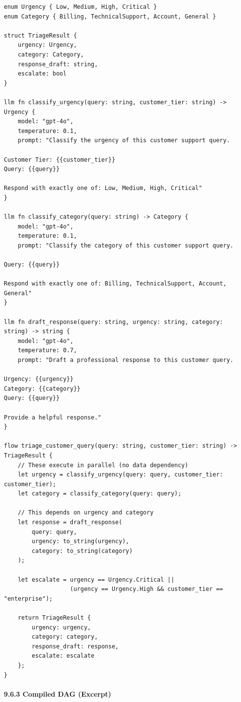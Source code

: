 \documentclass[
]{article}
\begin{document}
\begin{lstlisting}
enum Urgency { Low, Medium, High, Critical }
enum Category { Billing, TechnicalSupport, Account, General }

struct TriageResult {
    urgency: Urgency,
    category: Category,
    response_draft: string,
    escalate: bool
}

llm fn classify_urgency(query: string, customer_tier: string) -> Urgency {
    model: "gpt-4o",
    temperature: 0.1,
    prompt: "Classify the urgency of this customer support query.

Customer Tier: {{customer_tier}}
Query: {{query}}

Respond with exactly one of: Low, Medium, High, Critical"
}

llm fn classify_category(query: string) -> Category {
    model: "gpt-4o",
    temperature: 0.1,
    prompt: "Classify the category of this customer support query.

Query: {{query}}

Respond with exactly one of: Billing, TechnicalSupport, Account, General"
}

llm fn draft_response(query: string, urgency: string, category: string) -> string {
    model: "gpt-4o",
    temperature: 0.7,
    prompt: "Draft a professional response to this customer query.

Urgency: {{urgency}}
Category: {{category}}
Query: {{query}}

Provide a helpful response."
}

flow triage_customer_query(query: string, customer_tier: string) -> TriageResult {
    // These execute in parallel (no data dependency)
    let urgency = classify_urgency(query: query, customer_tier: customer_tier);
    let category = classify_category(query: query);
    
    // This depends on urgency and category
    let response = draft_response(
        query: query, 
        urgency: to_string(urgency), 
        category: to_string(category)
    );
    
    let escalate = urgency == Urgency.Critical || 
                   (urgency == Urgency.High && customer_tier == "enterprise");
    
    return TriageResult {
        urgency: urgency,
        category: category,
        response_draft: response,
        escalate: escalate
    };
}
\end{lstlisting}

\paragraph{9.6.3 Compiled DAG (Excerpt)}\label{compiled-dag-excerpt}
\end{document}
